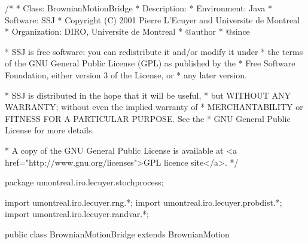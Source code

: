 \begin{code}
\begin{hide}
/*
 * Class:        BrownianMotionBridge
 * Description:  
 * Environment:  Java
 * Software:     SSJ 
 * Copyright (C) 2001  Pierre L'Ecuyer and Universite de Montreal
 * Organization: DIRO, Universite de Montreal
 * @author       
 * @since

 * SSJ is free software: you can redistribute it and/or modify it under
 * the terms of the GNU General Public License (GPL) as published by the
 * Free Software Foundation, either version 3 of the License, or
 * any later version.

 * SSJ is distributed in the hope that it will be useful,
 * but WITHOUT ANY WARRANTY; without even the implied warranty of
 * MERCHANTABILITY or FITNESS FOR A PARTICULAR PURPOSE.  See the
 * GNU General Public License for more details.

 * A copy of the GNU General Public License is available at
   <a href="http://www.gnu.org/licenses">GPL licence site</a>.
 */
\end{hide}
package umontreal.iro.lecuyer.stochprocess;\begin{hide}
import umontreal.iro.lecuyer.rng.*;
import umontreal.iro.lecuyer.probdist.*;
import umontreal.iro.lecuyer.randvar.*;

\end{hide}

public class BrownianMotionBridge extends BrownianMotion \begin{hide} {
    protected int          bridgeCounter = -1; // Before 1st observ

    // For precomputations for B Bridge
    protected double[]     wMuDt,
                           wSqrtDt;
    protected int[]        wIndexList,
                           ptIndex;
\end{hide}
\end{code}
